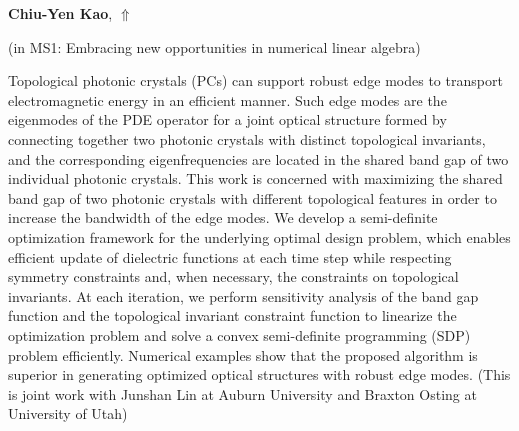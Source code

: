 \documentclass[ILAS2025-program.tex]{subfiles}
\begin{document}
     \hypertarget{down0070}{}\begin{ilasabstract}
    
    \textbf{Chiu-Yen Kao},  \hfill \hyperlink{up0070}{$\Uparrow$}
    
    (in {\color{mstitle}MS1: Embracing new opportunities in numerical linear algebra})
        
        \mtskip
    Topological photonic crystals (PCs) can support robust edge modes to transport electromagnetic energy in an efficient manner. Such edge modes are the eigenmodes of the PDE operator for a joint optical structure formed by connecting together two photonic crystals with distinct topological invariants, and the corresponding eigenfrequencies are located in the shared band gap of two individual photonic crystals. This work is concerned with maximizing the shared band gap of two photonic crystals with different topological features in order to increase the bandwidth of the edge modes. We develop a semi-definite optimization framework for the underlying optimal design problem, which enables efficient update of dielectric functions at each time step while respecting symmetry constraints and, when necessary, the constraints on topological invariants. At each iteration, we perform sensitivity analysis 
of the band gap function and the topological invariant constraint function to linearize the optimization problem and solve a convex semi-definite programming (SDP) problem efficiently. Numerical examples show that the proposed algorithm is superior in generating optimized optical structures with robust edge modes. (This is joint work with Junshan Lin at Auburn University and Braxton Osting at University of Utah)\end{ilasabstract}
\end{document}
